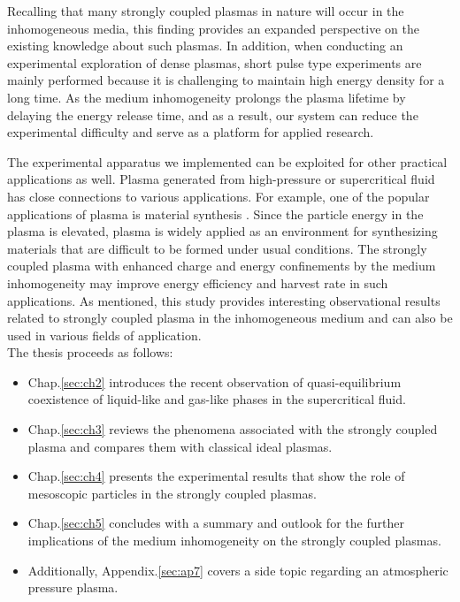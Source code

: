 Recalling that many strongly coupled plasmas in nature will occur in the inhomogeneous media, this finding provides an expanded perspective on the existing knowledge about such plasmas. In addition, when conducting an experimental exploration of dense plasmas, short pulse type experiments are mainly performed because it is challenging to maintain high energy density for a long time. As the medium inhomogeneity prolongs the plasma lifetime by delaying the energy release time, and as a result, our system can reduce the experimental difficulty and serve as a platform for applied research.

The experimental apparatus we implemented can be exploited for other practical applications as well. Plasma generated from high-pressure or supercritical fluid has close connections to various applications. For example, one of the popular applications of plasma is material synthesis \cite{vollath2008plasma, kramer2015cold, stauss2015review}. Since the particle energy in the plasma is elevated, plasma is widely applied as an environment for synthesizing materials that are difficult to be formed under usual conditions. The strongly coupled plasma with enhanced charge and energy confinements by the medium inhomogeneity may improve energy efficiency and harvest rate in such applications. As mentioned, this study provides interesting observational results related to strongly coupled plasma in the inhomogeneous medium and can also be used in various fields of application. \\

The thesis proceeds as follows:
\begin{itemize}
  \item Chap.\ref{sec:ch2} introduces the recent observation of quasi-equilibrium coexistence of liquid-like and gas-like phases in the supercritical fluid.
  \item Chap.\ref{sec:ch3} reviews the phenomena associated with the strongly coupled plasma and compares them with classical ideal plasmas.
  \item Chap.\ref{sec:ch4} presents the experimental results that show the role of mesoscopic particles in the strongly coupled plasmas.
  \item Chap.\ref{sec:ch5} concludes with a summary and outlook for the further implications of the medium inhomogeneity on the strongly coupled plasmas.
  \item Additionally, Appendix.\ref{sec:ap7} covers a side topic regarding an atmospheric pressure plasma.
\end{itemize}
